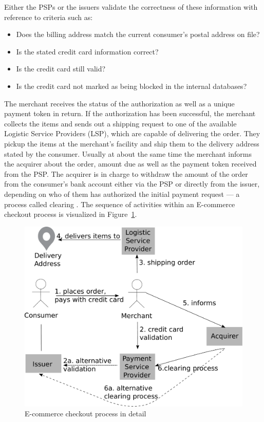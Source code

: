 Either the \gls{PSP}s or the issuers validate the correctness of these information with reference to criteria such as: \@

\begin{itemize}
    \item Does the billing address match the current consumer's postal address on file?
    \item Is the stated credit card information correct?
    \item Is the credit card still valid?
    \item Is the credit card not marked as being blocked in the internal databases?
\end{itemize}

The merchant receives the status of the authorization as well as a unique payment token in return. If the authorization has been successful, the merchant collects the items and sends out a shipping request to one of the available Logistic Service Providers (\gls{LSP}), which are capable of delivering the order. They pickup the items at the merchant's facility and ship them to the delivery address stated by the consumer. Usually at about the same time the merchant informs the acquirer about the order, amount due as well as the payment token received from the \gls{PSP}. The acquirer is in charge to withdraw the amount of the order from the consumer's bank account either via the \gls{PSP} or directly from the issuer, depending on who of them has authorized the initial payment request --- a process called clearing \citep{VisaPayment2014}. The sequence of activities within an \gls{E-commerce} checkout process is visualized in Figure~\ref{fig:images_ecommerce_checkout_process}.\@

\begin{figure}[!ht]
	\centering
		\includegraphics[width=0.9\columnwidth]{images/e-commerce-checkout-process.pdf}
	\caption{\Gls{E-commerce} checkout process in detail}
\label{fig:images_ecommerce_checkout_process}
\end{figure}

